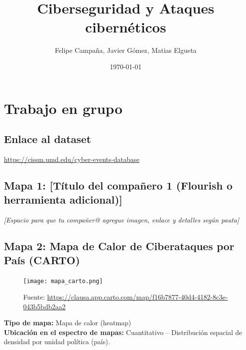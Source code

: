 \documentclass[12pt, a4paper]{article}
\title{Ciberseguridad y Ataques cibernéticos}
\author{Felipe Campaña, Javier Gómez, Matias Elgueta}
\date{\today\\[2cm]}
\begin{document}
\maketitle

\vspace*{0.3cm}
\begin{figure}[H]
    \centering
    \begin{minipage}[t]{0.45\linewidth}
    \end{minipage}
    \hfill
    \begin{minipage}[t]{0.45\linewidth}
    \end{minipage}
\end{figure}

\section*{Trabajo en grupo}

\subsection*{Enlace al dataset}
\url{https://cissm.umd.edu/cyber-events-database}

\vspace{1em}
\subsection*{Mapa 1: [Título del compañero 1 (Flourish o herramienta adicional)]}
\textit{[Espacio para que tu compañer@ agregue imagen, enlace y detalles según pauta]}

\subsection*{Mapa 2: Mapa de Calor de Ciberataques por País (CARTO)}

\begin{figure}[H]
    \centering
    \texttt{[image: mapa\_carto.png]}
    \caption[1]{Fuente: \url{https://clausa.app.carto.com/map/f16b7877-40d4-4182-8c3e-043b5bdb2aa2}}
\end{figure}

\textbf{Tipo de mapa:} Mapa de calor (heatmap) \\
\textbf{Ubicación en el espectro de mapas:} Cuantitativo – Distribución espacial de densidad por unidad política (país). \\
\end{document}

